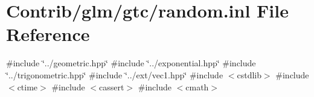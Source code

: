\hypertarget{random_8inl}{}\section{Contrib/glm/gtc/random.inl File Reference}
\label{random_8inl}
{\ttfamily \#include \char`\"{}../geometric.\+hpp\char`\"{}}\newline
{\ttfamily \#include \char`\"{}../exponential.\+hpp\char`\"{}}\newline
{\ttfamily \#include \char`\"{}../trigonometric.\+hpp\char`\"{}}\newline
{\ttfamily \#include \char`\"{}../ext/vec1.\+hpp\char`\"{}}\newline
{\ttfamily \#include $<$cstdlib$>$}\newline
{\ttfamily \#include $<$ctime$>$}\newline
{\ttfamily \#include $<$cassert$>$}\newline
{\ttfamily \#include $<$cmath$>$}\newline
